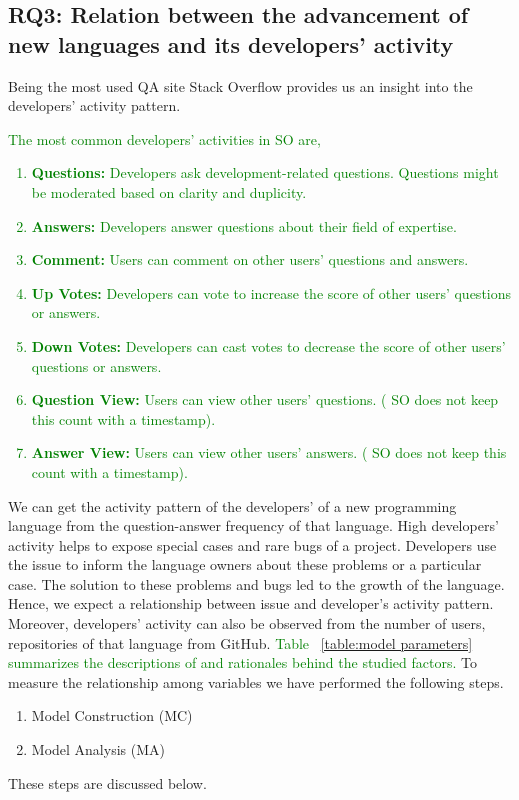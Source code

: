 \subsection{RQ3: Relation between the advancement of new languages and its developers' activity}
\label{RQ3}
Being the most used QA site Stack Overflow provides us an insight into the developers' activity pattern. \textcolor{green}{The most common developers' activities in SO \citep{Badashian2014} are,
\begin{enumerate}
    \item \textbf{Questions:} Developers ask development-related questions. Questions might be moderated based on clarity and duplicity.
    \item \textbf{Answers:}  Developers answer questions about their field of expertise.
    \item \textbf{Comment:} Users can comment on other users' questions and answers.
    \item \textbf{Up Votes:} Developers can vote to increase the score of other users' questions or answers.
    \item \textbf{Down Votes:} Developers can cast votes to decrease the score of other users' questions or answers.
    \item \textbf{Question View:} Users can view other users' questions. ( SO does not keep this count with a timestamp).
    \item \textbf{Answer View:} Users can view other users' answers. ( SO does not keep this count with a timestamp).
\end{enumerate}}
We can get the activity pattern of the developers' of a new programming language from the question-answer frequency of that language. High developers' activity helps to expose special cases and rare bugs of a project. Developers use the issue to inform the language owners about these problems or a particular case. The solution to these problems and bugs led to the growth of the language. Hence, we expect a  relationship between issue and developer's activity pattern. Moreover, developers' activity can also be observed from the number of users, repositories of that language from GitHub. \textcolor{green}{Table ~\ref{table:model parameters} summarizes the descriptions of and rationales behind the studied factors.} To measure the relationship among variables we have performed the following steps.

\begin{enumerate}
    \item Model Construction (MC)
    \item Model Analysis (MA)
\end{enumerate}
These steps are discussed below.

